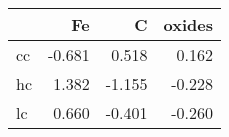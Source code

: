 \begin{tabular}{lrrr}
\toprule
{} &     Fe &      C &  oxides \\
\midrule
cc & -0.681 &  0.518 &   0.162 \\
hc &  1.382 & -1.155 &  -0.228 \\
lc &  0.660 & -0.401 &  -0.260 \\
\bottomrule
\end{tabular}
